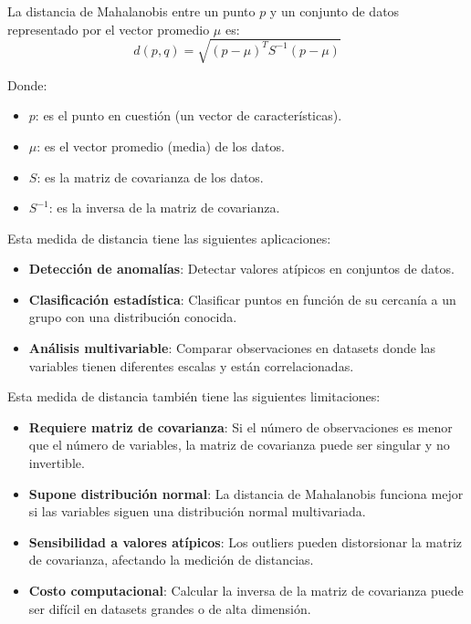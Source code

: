 \documentclass[12pt]{article}
\begin{document}
La distancia de Mahalanobis entre un punto $p$ y un conjunto de datos representado por el vector promedio $\mu$ es:
\begin{equation}
    d(p,q) = \sqrt{(p-\mu)^T S^{-1} (p-\mu)}
\end{equation} 

Donde:
\begin{itemize}
    \item $p$: es el punto en cuestión (un vector de características).
    \item $\mu$: es el vector promedio (media) de los datos.
    \item $S$: es la matriz de covarianza de los datos.
    \item $S^{-1}$: es la inversa de la matriz de covarianza.
\end{itemize}

Esta medida de distancia tiene las siguientes aplicaciones:
\begin{itemize}
    \item \textbf{Detección de anomalías}: Detectar valores atípicos en conjuntos de datos.
    \item \textbf{Clasificación estadística}: Clasificar puntos en función de su cercanía a un grupo con una distribución conocida.
    \item \textbf{Análisis multivariable}: Comparar observaciones en datasets donde las variables tienen diferentes escalas y están correlacionadas.
\end{itemize}

Esta medida de distancia también tiene las siguientes limitaciones:
\begin{itemize}
    \item \textbf{Requiere matriz de covarianza}: Si el número de observaciones es menor que el número de variables, la matriz de covarianza puede ser singular y no invertible.
    \item \textbf{Supone distribución normal}: La distancia de Mahalanobis funciona mejor si las variables siguen una distribución normal multivariada. 
    \item \textbf{Sensibilidad a valores atípicos}: Los outliers pueden distorsionar la matriz de covarianza, afectando la medición de distancias.
    \item \textbf{Costo computacional}: Calcular la inversa de la matriz de covarianza puede ser difícil en datasets grandes o de alta dimensión.
\end{itemize}
~\cite{De0a100enIA}
\end{document}
